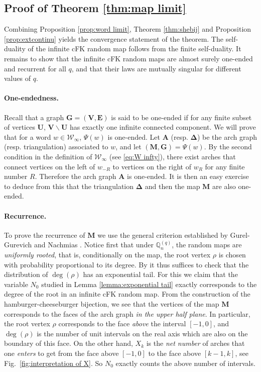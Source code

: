 \documentclass[a4paper]{article}
\newcommand*{\map}{\mathbf}
\newcommand*{\W}{\mathcal{W}}
\newcommand*{\m}{\map{M}}
\begin{document}
\subsection{Proof of Theorem \ref{thm:map limit}}\label{sub:proof}
Combining Proposition \ref{prop:word limit}, Theorem \ref{thm:shebij} and Proposition \ref{prop:extcontinu} yields the convergence statement of the theorem. The self-duality of the infinite cFK random map follows from the finite self-duality. It remains to show that the infinite cFK random maps are almost surely one-ended and recurrent for all $q$, and that their laws are mutually singular for different values of $q$.

\paragraph{One-endedness.} Recall that a graph $\map{G=(V,E)}$ is said to be one-ended if for any finite subset of vertices $\map{U}$, $\map{V\backslash U}$ has exactly one infinite connected component.
We will prove that for a word $w\in\W_\infty$, $\Psi(w)$ is one-ended.
Let $\map{A}$ (resp. $\map{\Delta}$) be the arch graph (resp. triangulation) associated to $w$, and let $(\map{M,G})=\Psi(w)$.
By the second condition in the definition of $\W_\infty$ (see \eqref{eq:W infty}), there exist arches that connect vertices on the left of $w_{-R}$ to vertices on the right of $w_R$ for any finite number $R$.
Therefore the arch graph $\map{A}$ is one-ended. It is then an easy exercise to deduce from this that the triangulation $\map{\Delta}$ and then the map $ \mathbf{M}$ are also one-ended.

\paragraph{Recurrence.} To prove the recurrence of $\m $ we use the general criterion established by  Gurel-Gurevich and Nachmias \cite{GGN13a}. Notice first that under $ \mathbb{Q}_{n}^{(q)}$, the random maps are  \emph{uniformly rooted}, that is, conditionally on the map, the root vertex $\rho$ is chosen with probability proportional to its degree. By \cite{GGN13a} it thus suffices to check that the distribution of $\deg(\rho)$ has an exponential tail. For this we claim that the variable $N_{0}$ studied in Lemma \ref{lemma:exponential tail} exactly corresponds to the degree of the root in an infinite cFK random map.
From the construction of the hamburger-cheeseburger bijection, we see that the vertices of the map $\m $ corresponds to the faces of the arch graph \emph{in the upper half plane}.
In particular, the root vertex $\rho$ corresponds to the face \emph{above} the interval $[-1,0]$, and $\deg(\rho)$ is the number of unit intervals on the real axis which are also on the boundary of this face.
On the other hand, $X_k$ is the \emph{net number} of arches that one \emph{enters} to get from the face above $[-1,0]$ to the face above $[k-1,k]$, see Fig.~\ref{fig:interpretation of X}.
So $N_{0}$ exactly counts the above number of intervals.
\end{document}
